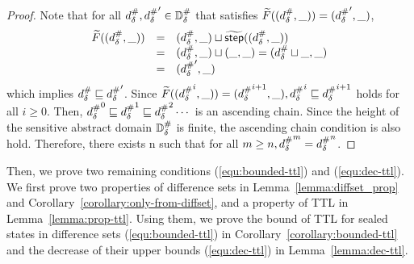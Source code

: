 \begin{proof}
Note that for all ${{d}^{\#}_\delta}, {{d}^{\#}_\delta}' \in {\mathbb{D}}^{\#}_\delta$ that satisfies
$\widetilde{F}(({{d}^{\#}_\delta}, \_)) = ({{d}^{\#}_\delta}', \_)$,
\[
  \begin{array}{rcl}
  \widetilde{F}(({{d}^{\#}_\delta}, \_))
  &=& ({{d}^{\#}_\delta}, \_) \sqcup \widetilde{\textsf{step}}(({{d}^{\#}_\delta}, \_))\\
  &=& ({{d}^{\#}_\delta}, \_) \sqcup (\_, \_) = ({{d}^{\#}_\delta} \sqcup \_, \_)\\
  &=& ({{d}^{\#}_\delta}', \_)
  \end{array}
\]
which implies ${{d}^{\#}_\delta} \sqsubseteq {{d}^{\#}_\delta}'$.  Since
$\widetilde{F}(({{d}^{\#}_\delta}^i, \_)) = ({{d}^{\#}_\delta}^{i+1}, \_), {{d}^{\#}_\delta}^i \sqsubseteq
{{d}^{\#}_\delta}^{i+1}$ holds for all $i \geq 0$.  Then, ${{d}^{\#}_\delta}^0 \sqsubseteq {{d}^{\#}_\delta}^1
\sqsubseteq {{d}^{\#}_\delta}^2 \cdots$ is an ascending chain.  Since the height of the
sensitive abstract domain ${\mathbb{D}}^{\#}_\delta$ is finite, the ascending chain condition is
also hold. Therefore, there exists n such that for all $m \geq n, {{d}^{\#}_\delta}^m =
{{d}^{\#}_\delta}^n$.
\end{proof}

Then, we prove two remaining conditions (\ref{equ:bounded-ttl}) and
(\ref{equ:dec-ttl}).  We first prove two properties of difference sets in
Lemma~\ref{lemma:diffset_prop} and Corollary~\ref{corollary:only-from-diffset},
and a property of TTL in Lemma~\ref{lemma:prop-ttl}.  Using them, we prove the
bound of TTL for sealed states in difference sets (\ref{equ:bounded-ttl}) in
Corollary~\ref{corollary:bounded-ttl} and the decrease of their upper bounds
(\ref{equ:dec-ttl}) in Lemma~\ref{lemma:dec-ttl}.

